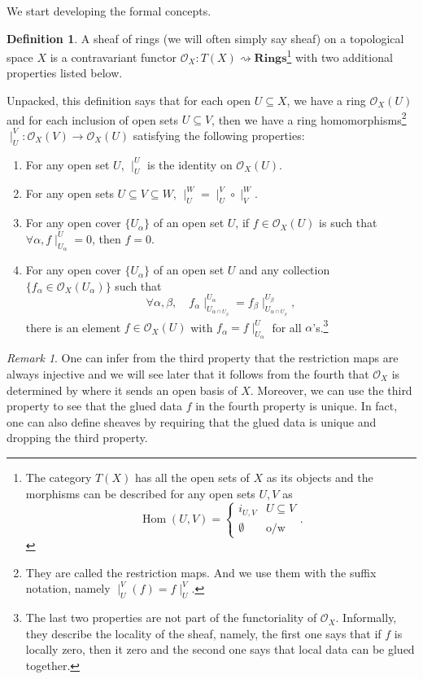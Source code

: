 \documentclass{tufte-handout} %
\theoremstyle{definition}
\newtheorem{defn}[thm]{Definition}
\theoremstyle{remark}
\newtheorem{rem}[thm]{Remark}
\newcommand{\mO}{\mathcal{O}}
\DeclareMathOperator{\Hom}{Hom}
\begin{document}
We start developing the formal concepts.

\begin{defn}
	A sheaf of rings (we will often simply say sheaf) on a topological space $X$ is a contravariant functor $\mO_X: T(X) \rightsquigarrow \textbf{Rings}$\footnote{The category $T(X)$ has all the open sets of $X$ as its objects and the morphisms can be described for any open sets $U,V$ as \[\Hom(U,V) = \begin{cases}i_{U,V} &U \subseteq V\\\emptyset &\text{o/w}\end{cases}.\]} with two additional properties listed below. 
	
	Unpacked, this definition says that for each open $U \subseteq X$, we have a ring $\mO_X(U)$ and for each inclusion of open sets $U \subseteq V$, then we have a ring homomorphisms\footnote{They are called the restriction maps. And we use them with the suffix notation, namely $\mid^V_U(f) = f\mid^V_U$.} $\mid^V_U : \mO_X(V) \rightarrow \mO_X(U)$ satisfying the following properties:
	\begin{enumerate}
		\item For any open set $U$, $\mid^U_U$ is the identity on $\mO_X(U)$.
		\item For any open sets $U \subseteq V \subseteq W$, $\mid^W_U = \mid^V_U \circ \mid^W_V$.
		\item For any open cover $\{U_{\alpha}\}$ of an open set $U$, if $f \in \mO_X(U)$ is such that $\forall \alpha, f\mid^U_{U_{\alpha}} = 0$, then $f = 0$.
		\item For any open cover $\{U_{\alpha}\}$ of an open set $U$ and any collection $\{f_{\alpha} \in \mO_X(U_{\alpha})\}$ such that
		\[\forall \alpha, \beta, \quad f_{\alpha}\mid^{U_{\alpha}}_{U_{\alpha \cap U_{\beta}}} = f_{\beta}\mid^{U_{\beta}}_{U_{\alpha \cap U_{\beta}}},\] there is an element $f \in \mO_X(U)$ with $f_{\alpha} = f\mid^U_{U_{\alpha}}$ for all $\alpha$'s.\footnote{The last two properties are not part of the functoriality of $\mO_X$. Informally, they describe the locality of the sheaf, namely, the first one says that if $f$ is locally zero, then it zero and the second one says that local data can be glued together.}
	\end{enumerate}
\end{defn}
\begin{rem}
	One can infer from the third property that the restriction maps are always injective and we will see later that it follows from the fourth that $\mO_X$ is determined by where it sends an open basis of $X$. Moreover, we can use the third property to see that the glued data $f$ in the fourth property is unique. In fact, one can also define sheaves by requiring that the glued data is unique and dropping the third property.%
\end{rem}
\end{document}
